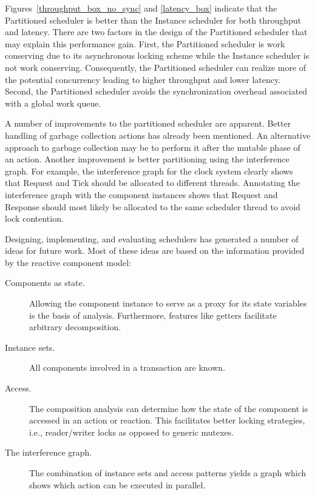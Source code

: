 Figures~\ref{throughput_box_no_sync} and \ref{latency_box} indicate that the Partitioned scheduler is better than the Instance scheduler for both throughput and latency.
There are two factors in the design of the Partitioned scheduler that may explain this performance gain.
First, the Partitioned scheduler is work conserving due to its asynchronous locking scheme while the Instance scheduler is not work conserving.
Consequently, the Partitioned scheduler can realize more of the potential concurrency leading to higher throughput and lower latency.
Second, the Partitioned scheduler avoids the synchronization overhead associated with a global work queue.

A number of improvements to the partitioned scheduler are apparent.
Better handling of garbage collection actions has already been mentioned.
An alternative approach to garbage collection may be to perform it after the mutable phase of an action.
Another improvement is better partitioning using the interference graph.
For example, the interference graph for the clock system clearly shows that Request and Tick should be allocated to different threads.
Annotating the interference graph with the component instances shows that Request and Response should most likely be allocated to the same scheduler thread to avoid lock contention.

Designing, implementing, and evaluating schedulers has generated a number of ideas for future work.
Most of these ideas are based on the information provided by the reactive component model:
\begin{description}
\item[Components as state.]  Allowing the component instance to serve as a proxy for its state variables is the basis of analysis.  Furthermore, features like getters facilitate arbitrary decomposition.
\item[Instance sets.]  All components involved in a transaction are known.
\item[Access.]  The composition analysis can determine how the state of the component is accessed in an action or reaction.  This facilitates better locking strategies, i.e., reader/writer locks as opposed to generic mutexes.
\item[The interference graph.]  The combination of instance sets and access patterns yields a graph which shows which action can be executed in parallel.
\end{description}

